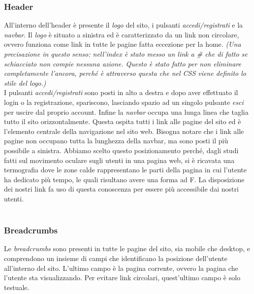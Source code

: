 \subsubsection{Header}
All’interno dell’header è presente il \textit{logo} del sito, i pulsanti \textit{accedi/registrati} e la \textit{navbar}.
Il \textit{logo} è situato a sinistra ed è caratterizzato da un link non circolare, ovvero funziona come link in tutte le pagine fatta eccezione per la home. \textit{(Una precisazione in questo senso: nell'index è stato messo un link a \# che di fatto se schiacciato non compie nessuna azione. Questo è stato fatto per non eliminare completamente l'ancora, perché è attraverso questa che nel CSS viene definito lo stile del logo.)} \\
I pulsanti \textit{accedi/registrati} sono posti in alto a destra e dopo aver effettuato il login o la registrazione, spariscono, lasciando spazio ad un singolo pulsante \textit{esci} per uscire dal proprio account.
Infine la \textit{navbar} occupa una lunga linea che taglia tutto il sito orizzontalmente.
Questa ospita tutti i link alle pagine del sito ed è l’elemento centrale della navigazione nel sito web.
Bisogna notare che i link alle pagine non occupano tutta la lunghezza della navbar, ma sono posti il più possibile a sinistra.
Abbiamo scelto questo posizionamento perché, dagli studi fatti sul movimento oculare sugli utenti in una pagina web, si è ricavata una termograﬁa dove le zone calde rappresentano le parti della pagina in cui l’utente ha dedicato più tempo, le quali risultano avere una forma ad F.
La disposizione dei nostri link fa uso di questa conoscenza per essere più accessibile dai nostri utenti. \\ \\

\begin{center}
\end{center}


\subsubsection{Breadcrumbs}
Le \textit{breadcrumbs} sono presenti in tutte le pagine del sito, sia mobile che desktop, e comprendono un insieme di campi che identiﬁcano la posizione dell’utente all’interno del sito. L’ultimo campo è la pagina corrente, ovvero la pagina che l’utente sta visualizzando. Per evitare link circolari, quest’ultimo campo è solo testuale.

